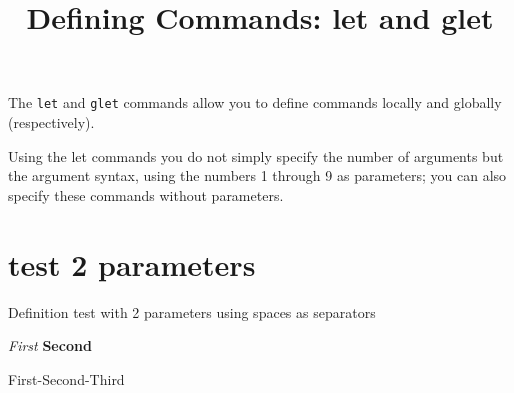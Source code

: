 \documentclass{article}
\title{Defining Commands: let and glet}
\author{}
\date{}
\def\test#1#2{\emph{#1} \textbf{#2}}
\begin{document}
\maketitle

The \texttt{let} and \texttt{glet} commands allow you to define commands locally and globally (respectively). 

Using the let commands you do not simply specify the number of arguments but the argument syntax, using the numbers 1 through 9 as parameters; you can also specify these commands without parameters.


\section*{test 2 parameters}

Definition test with 2 parameters using spaces as separators
\newline

\test{First}{Second}

\td First-Second-Third \endtd
\end{document}
